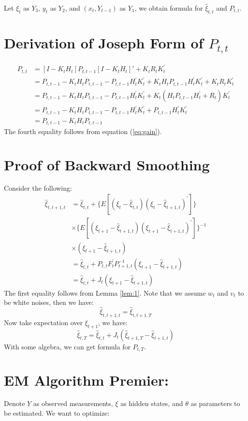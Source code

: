 \documentclass[12pt]{article}
\numberwithin{equation}{section}
\begin{document}
Let $\xi_t$ as $Y_3$, $y_t$ as $Y_2$, and $(x_t,Y_{t-1})$ as $Y_1$, we obtain formula for $\hat{\xi}_{t,t}$ and $P_{t,t}$.

\section{Derivation of Joseph Form of $P_{t,t}$} \label{ap:joseph}
\begin{align*}
    P_{t,t} &= [I - K_tH_t]P_{t,t-1}[I - K_tH_t]' + K_tR_tK_t^{'} \\
    &= P_{t,t-1} - K_tH_tP_{t,t-1} - P_{t,t-1}H_t^{'}K_t^{'} + K_tH_tP_{t,t-1}H_t^{'}K_t^{'} + K_tR_tK_t^{'} \\
    &= P_{t,t-1} - K_tH_tP_{t,t-1} - P_{t,t-1}H_t^{'}K_t^{'} + K_t(H_tP_{t,t-1}H_t^{'} + R_t)K_t^{'} \\
    &= P_{t,t-1} - K_tH_tP_{t,t-1} - P_{t,t-1}H_t^{'}K_t^{'} + P_{t,t-1}H_t^{'}K_t^{'} \\
    &= P_{t,t-1} - K_tH_tP_{t,t-1}
\end{align*}
The fourth equality follows from equation (\ref{eq:gain}).
\section{Proof of Backward Smoothing} \label{ap:smooth}
Consider the following:
\begin{align*}
    \hat{\xi}_{t,t+1,t} &= \hat{\xi}_{t,t} + \{E[(\xi_t-\hat{\xi}_{t,t})(\xi_t-\hat{\xi}_{t+1,t})^{'}]\} \\
    & \times \{E[(\xi_{t+1}-\hat{\xi}_{t+1,t})(\xi_{t+1}-\hat{\xi}_{t+1,t})^{'}]\}^{-1} \\
    & \times (\xi_{t+1} - \hat{\xi}_{t+1,t}) \\
    &= \hat{\xi}_{t,t} + P_{t,t}F_t^{'}P_{t+1,t}^{-1}(\xi_{t+1}-\hat{\xi}_{t+1,t}) \\
    &= \hat{\xi}_{t,t} + J_t(\xi_{t+1}-\hat{\xi}_{t+1,t})
\end{align*}
The first equality follows from Lemma \ref{lem:1}. Note that we assume $w_t$ and $v_t$ to be white noises, then we have:
\[
    \hat{\xi}_{t,t+1,t} = \hat{\xi}_{t,t+1,T}
\]
Now take expectation over $\xi_{t+1}$, we have:
\[
    \hat{\xi}_{t,T} = \hat{\xi}_{t,t} + J_t(\hat{\xi}_{t+1,T}-\hat{\xi}_{t+1,t})
\]
With some algebra, we can get formula for $P_{t,T}$.

\section{EM Algorithm Premier:} \label{ap:EM_proof}
Denote $Y$ as observed measurements, $\xi$ as hidden states, and $\theta$ as parameters to be estimated. We want to optimize:
\end{document}
